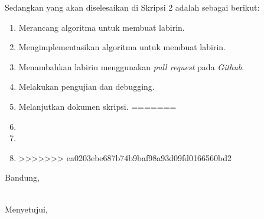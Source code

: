 \documentclass[a4paper,twoside]{article}
\begin{document}
Sedangkan yang akan diselesaikan di Skripsi 2 adalah sebagai berikut:
\begin{enumerate}
<<<<<<< HEAD
\item Merancang algoritma untuk membuat labirin. 
\item Mengimplementasikan algoritma untuk membuat labirin.
\item Menambahkan labirin menggunakan \textit{pull request} pada \textit{Github}.
\item Melakukan pengujian dan debugging.
\item Melanjutkan dokumen skripsi.
=======
\item
\item
\item
>>>>>>> ea0203ebe687b74b9baf98a93d09fd0166560bd2
\end{enumerate}

\vspace{1cm}
\centering Bandung, \tanggal\\
\vspace{2cm} \nama \\ 
\vspace{1cm}

Menyetujui, \\
\end{document}

